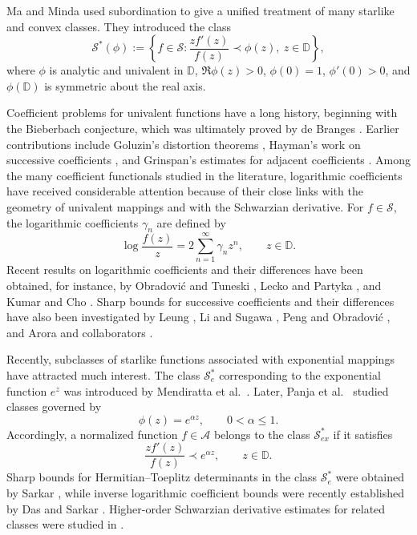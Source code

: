 \documentclass[10pt,a4paper]{amsart}
\numberwithin{equation}{section}
\begin{document}
Ma and Minda \cite{MM} used subordination to give a unified treatment of many starlike and convex classes. They introduced the class
\[
\mathcal{S}^{*}(\phi)
:=
\left\{
f\in\mathcal{S}:
\frac{zf'(z)}{f(z)}\prec \phi(z),\ z\in\mathbb{D}
\right\},
\]
where $\phi$ is analytic and univalent in $\mathbb{D}$, $\Re\phi(z)>0$, $\phi(0)=1$, $\phi'(0)>0$, and $\phi(\mathbb{D})$ is symmetric about the real axis.

Coefficient problems for univalent functions have a long history, beginning with the Bieberbach conjecture, which was ultimately proved by de Branges \cite{LDB1}. Earlier contributions include Goluzin's distortion theorems \cite{G1}, Hayman's work on successive coefficients \cite{H}, and Grinspan's estimates for adjacent coefficients \cite{G2}. Among the many coefficient functionals studied in the literature, logarithmic coefficients have received considerable attention because of their close links with the geometry of univalent mappings and with the Schwarzian derivative. For $f\in\mathcal{S}$, the logarithmic coefficients $\gamma_n$ are defined by
\[
\log\frac{f(z)}{z}
=
2\sum_{n=1}^{\infty}\gamma_n z^n,\qquad z\in\mathbb{D}.
\]
Recent results on logarithmic coefficients and their differences have been obtained, for instance, by Obradovi\'c and Tuneski \cite{Obradovic2024}, Lecko and Partyka \cite{Lecko2023}, and Kumar and Cho \cite{Kumar2023}. Sharp bounds for successive coefficients and their differences have also been investigated by Leung \cite{Leung1978}, Li and Sugawa \cite{LiSugawa}, Peng and Obradovi\'c \cite{Peng2019}, and Arora and collaborators \cite{Arora2019,Arora2022,Arora2023}.

Recently, subclasses of starlike functions associated with exponential mappings have attracted much interest. The class $\mathcal{S}_e^*$ corresponding to the exponential function $e^z$ was introduced by Mendiratta et al.\ \cite{Mendiratta2015}. Later, Panja et al.\ \cite{Panja2026} studied classes governed by
\[
\phi(z)=e^{\alpha z},\qquad 0<\alpha\le1.
\]
Accordingly, a normalized function $f\in\mathcal{A}$ belongs to the class $\mathcal{S}_{ex}^{\ast}$ if it satisfies
\begin{equation}\label{subordination}
\frac{zf'(z)}{f(z)}\prec e^{\alpha z},\qquad z\in\mathbb{D}.
\end{equation}
Sharp bounds for Hermitian--Toeplitz determinants in the class $\mathcal{S}_e^*$ were obtained by Sarkar \cite{Sarkar}, while inverse logarithmic coefficient bounds were recently established by Das and Sarkar \cite{DasSarkar2026}. Higher-order Schwarzian derivative estimates for related classes were studied in \cite{Das2026a,Srivastava2026}.
\end{document}
